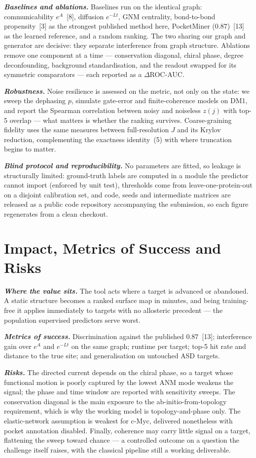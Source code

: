 \documentclass[10pt,a4paper]{article}
\newcommand{\lead}[1]{\textbf{\textit{#1}}}
\begin{document}
\lead{Baselines and ablations.} Baselines run on the identical graph: communicability
$e^{A}$~[8], diffusion $e^{-Lt}$, GNM centrality, bond-to-bond propensity~[3]
as the strongest published method here, PocketMiner ($0.87$)~[13] as the learned
reference, and a random ranking. The two sharing our graph and generator are decisive: they separate
interference from graph structure. Ablations remove one component at a time --- conservation diagonal,
chiral phase, degree deconfounding, background standardisation, and the readout swapped for its
symmetric comparators --- each reported as a $\Delta$ROC-AUC.

\lead{Robustness.} Noise resilience is assessed on the metric, not only on the state: we sweep the
dephasing $p$, simulate gate-error and finite-coherence models on DM1, and report the Spearman
correlation between noisy and noiseless $z(j)$ with top-5 overlap --- what matters is whether the
ranking survives. Coarse-graining fidelity uses the same measures between full-resolution $J$ and its
Krylov reduction, complementing the exactness identity~(5) with where truncation begins to matter.

\lead{Blind protocol and reproducibility.} No parameters are fitted, so leakage is structurally
limited: ground-truth labels are computed in a module the predictor cannot import (enforced by unit
test), thresholds come from leave-one-protein-out on a disjoint calibration set, and code, seeds and
intermediate matrices are released as a public code repository accompanying the submission, so each
figure regenerates from a clean checkout.

\section{Impact, Metrics of Success and Risks}

\lead{Where the value sits.} The tool acts where a target is advanced or abandoned. A static structure
becomes a ranked surface map in minutes, and being training-free it applies immediately to targets
with no allosteric precedent --- the population supervised predictors serve worst.

\lead{Metrics of success.} Discrimination against the published $0.87$~[13];
interference gain over $e^{A}$ and $e^{-Lt}$ on the same graph; runtime per target; top-5 hit rate
and distance to the true site; and generalisation on untouched ASD targets.

\lead{Risks.} The directed current depends on the chiral phase, so a target whose functional motion is
poorly captured by the lowest ANM mode weakens the signal; the phase and time window are reported with
sensitivity sweeps. The conservation diagonal is the main exposure to the ab-initio-from-topology
requirement, which is why the working model is topology-and-phase only. The elastic-network assumption
is weakest for c-Myc, delivered nonetheless with pocket annotation disabled. Finally, coherence may
carry little signal on a target, flattening the sweep toward chance --- a controlled outcome on a
question the challenge itself raises, with the classical pipeline still a working deliverable.
\end{document}
